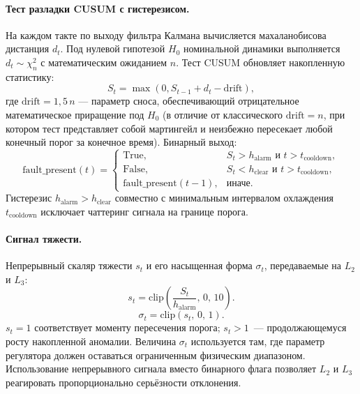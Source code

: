 \documentclass[a4paper,14pt]{extarticle}
\newcommand{\CUSUM}{\textsc{CUSUM}}
\begin{document}
\paragraph{Тест разладки CUSUM с гистерезисом.} На каждом такте по выходу фильтра Калмана вычисляется махаланобисова дистанция $d_t$. Под нулевой гипотезой $H_0$ номинальной динамики выполняется $d_t \sim \chi^2_n$ с математическим ожиданием $n$. Тест \CUSUM{} обновляет накопленную статистику:
\begin{equation}
S_t = \max(0, S_{t-1} + d_t - \mathrm{drift}),
\label{eq:cusum}
\end{equation}
где $\mathrm{drift} = 1{,}5\,n$ — параметр сноса, обеспечивающий отрицательное математическое приращение под $H_0$ (в отличие от классического $\mathrm{drift} = n$, при котором тест представляет собой мартингейл и неизбежно пересекает любой конечный порог за конечное время). Бинарный выход:
\begin{equation}
\text{fault\_present}(t) = \begin{cases}
\text{True}, & S_t > h_{\text{alarm}} \text{ и } t > t_{\text{cooldown}}, \\
\text{False}, & S_t < h_{\text{clear}} \text{ и } t > t_{\text{cooldown}}, \\
\text{fault\_present}(t-1), & \text{иначе}.
\end{cases}
\label{eq:cusum-decision}
\end{equation}
Гистерезис $h_{\text{alarm}} > h_{\text{clear}}$ совместно с минимальным интервалом охлаждения $t_{\text{cooldown}}$ исключает чаттеринг сигнала на границе порога.

\paragraph{Сигнал тяжести.} Непрерывный скаляр тяжести $s_t$ и его насыщенная форма $\sigma_t$, передаваемые на $L_2$ и $L_3$:
\begin{equation}
s_t = \mathrm{clip}\!\left(\frac{S_t}{h_{\text{alarm}}},\, 0,\, 10\right).
\label{eq:severity}
\end{equation}
\begin{equation}
\sigma_t = \mathrm{clip}\!\left(s_t,\,0,\,1\right).
\label{eq:severity-saturated}
\end{equation}
$s_t = 1$ соответствует моменту пересечения порога; $s_t > 1$~--- продолжающемуся росту накопленной аномалии. Величина $\sigma_t$ используется там, где параметр регулятора должен оставаться ограниченным физическим диапазоном. Использование непрерывного сигнала вместо бинарного флага позволяет $L_2$ и $L_3$ реагировать пропорционально серьёзности отклонения.
\end{document}
